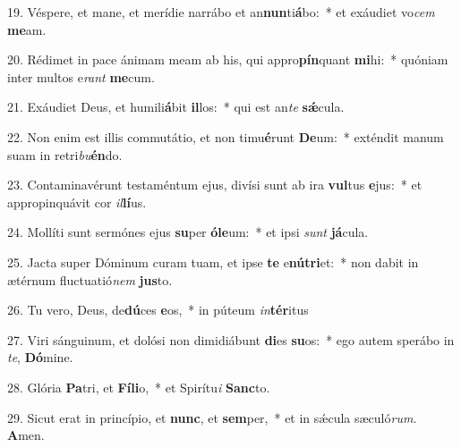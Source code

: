 19. Véspere, et mane, et merídie narrábo et an\textbf{nun}ti\textbf{á}bo:~*  et exáudiet vo\textit{cem} \textbf{me}am.\

20. Rédimet in pace ánimam meam ab his, qui appro\textbf{pín}quant \textbf{mi}hi:~*  quóniam inter multos e\textit{rant} \textbf{me}cum.\

21. Exáudiet Deus, et humili\textbf{á}bit \textbf{il}los:~*  qui est an\textit{te} \textbf{sǽ}cula.\

22. Non enim est illis commutátio, et non timu\textbf{é}runt \textbf{De}um:~*  exténdit manum suam in retri\textit{bu}\textbf{én}do.\

23. Contaminavérunt testaméntum ejus, divísi sunt ab ira \textbf{vul}tus \textbf{e}jus:~*  et appropinquávit cor \textit{il}\textbf{lí}us.\

24. Mollíti sunt sermónes ejus \textbf{su}per \textbf{ó}\textbf{le}um:~*  et ipsi \textit{sunt} \textbf{já}cula.\

25. Jacta super Dóminum curam tuam, et ipse \textbf{te} e\textbf{nú}\textbf{tri}et:~*  non dabit in ætérnum fluctuatió\textit{nem} \textbf{jus}to.\

26. Tu vero, Deus, de\textbf{dú}ces \textbf{e}os,~*  in púteum \textit{in}\textbf{tér}itus\

27. Viri sánguinum, et dolósi non dimidiábunt \textbf{di}es \textbf{su}os:~*  ego autem sperábo in \textit{te}, \textbf{Dó}mine.\

28. Glória \textbf{Pa}tri, et \textbf{Fí}\textbf{li}o,~*  et Spirítu\textit{i} \textbf{Sanc}to.\

29. Sicut erat in princípio, et \textbf{nunc}, et \textbf{sem}per,~*  et in sǽcula sæculó\textit{rum}. \textbf{A}men.\

